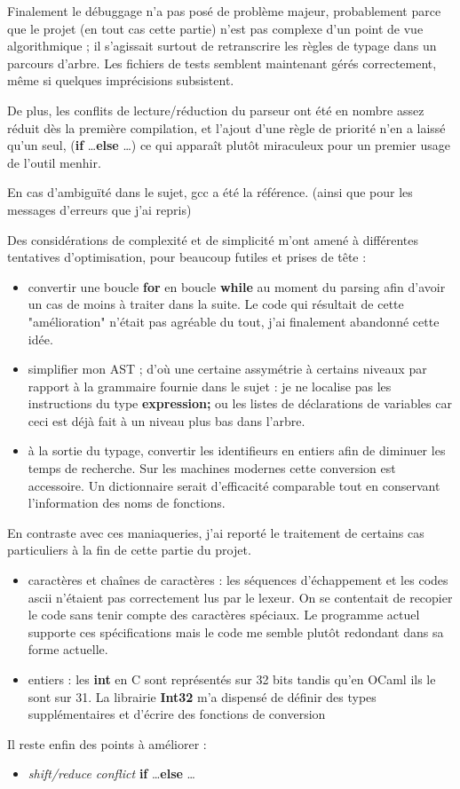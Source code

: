 \documentclass[a4paper]{article}
\begin{document}
Finalement le débuggage n'a pas posé de problème majeur, probablement
parce que le projet (en tout cas cette partie) n'est pas complexe d'un
point de vue algorithmique ; il s'agissait surtout de retranscrire les
règles de typage dans un parcours d'arbre. Les fichiers de
tests semblent maintenant gérés correctement, même si quelques
imprécisions subsistent.

De plus, les conflits de lecture/réduction du parseur ont été en nombre
assez réduit dès la première compilation, et l'ajout d'une règle de
priorité n'en a laissé qu'un seul, ({\bf if} \dots {\bf else} \dots) 
ce qui apparaît plutôt miraculeux pour un premier usage de l'outil
menhir.

En cas d'ambiguïté dans le sujet, gcc a été la référence. (ainsi que pour
les messages d'erreurs que j'ai repris)

Des considérations de complexité et de simplicité m'ont amené à 
différentes tentatives d'optimisation, pour beaucoup futiles et prises de
tête :

\begin{itemize}
  \item convertir une boucle {\bf for} en boucle {\bf while} au moment du
parsing afin d'avoir un cas de moins à traiter dans la suite. Le code qui
résultait de cette "amélioration" n'était pas agréable du tout, j'ai
finalement abandonné cette idée.
  \item simplifier mon AST ; d'où une certaine assymétrie à certains
niveaux par rapport à la grammaire fournie dans le sujet : je ne localise
pas les instructions du type {\bf expression;} ou les listes de déclarations de
variables car ceci est déjà fait à un niveau plus bas dans l'arbre.
  \item à la sortie du typage, convertir les identifieurs en entiers
afin de diminuer les temps de recherche. Sur les machines modernes cette
conversion est accessoire. Un dictionnaire serait d'efficacité
comparable tout en conservant l'information des noms de fonctions.
\end{itemize}

En contraste avec ces maniaqueries, j'ai reporté le traitement de
certains cas particuliers à la fin de cette partie du projet.

\begin{itemize}
  \item caractères et chaînes de caractères : les séquences
d'échappement et les codes ascii n'étaient pas correctement lus par le
lexeur. On se contentait de recopier le code sans tenir compte des
caractères spéciaux. Le programme actuel supporte ces spécifications mais
le code me semble plutôt redondant dans sa forme actuelle.
  \item entiers : les {\bf int} en C sont représentés sur 32 bits tandis
qu'en OCaml ils le sont sur 31. La librairie {\bf Int32} m'a dispensé de
définir des types supplémentaires et d'écrire des fonctions de conversion 
\end{itemize}

Il reste enfin des points à améliorer :

\begin{itemize}
  \item {\it shift/reduce conflict} {\bf if} \dots {\bf else} \dots
\end{itemize}
\end{document}

